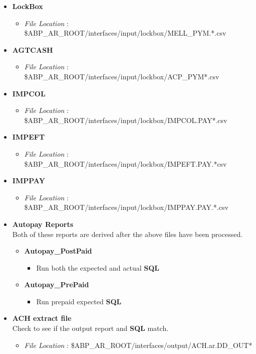 \documentclass[12pt,twoside]{article}
\begin{document}
\begin{itemize}
\item \textbf{LockBox}
\begin{itemize}
\item \emph{File Location} : \$ABP\_AR\_ROOT/interfaces/input/lockbox/MELL\_PYM.*.csv
\end{itemize}
\item \textbf{AGTCASH}
\begin{itemize}
\item \emph{File Location} : \$ABP\_AR\_ROOT/interfaces/input/lockbox/ACP\_PYM*.csv
\end{itemize}
\item \textbf{IMPCOL}
\begin{itemize}
\item \emph{File Location} : \$ABP\_AR\_ROOT/interfaces/input/lockbox/IMPCOL.PAY*.csv
\end{itemize}
\item \textbf{IMPEFT}
\begin{itemize}
\item \emph{File Location} : \$ABP\_AR\_ROOT/interfaces/input/lockbox/IMPEFT.PAY.*csv
\end{itemize}
\item \textbf{IMPPAY}
\begin{itemize}
\item \emph{File Location} : \$ABP\_AR\_ROOT/interfaces/input/lockbox/IMPPAY.PAY.*.csv
\end{itemize}
\item \textbf{Autopay Reports} \\ Both of these reports are derived after the above files have been processed.
\begin{itemize}
\item \textbf{Autopay\_PostPaid}
\begin{itemize}
\item Run both the expected and actual \textbf{SQL}
\end{itemize}
\item \textbf{Autopay\_PrePaid}
\begin{itemize}
\item Run prepaid expected \textbf{SQL}
\end{itemize}
\end{itemize}
\item \textbf{ACH extract file} \\Check to see if the output report and \textbf{SQL} match.
\begin{itemize}
\item \emph{File Location} : \$ABP\_AR\_ROOT/interfaces/output/ACH.ar.DD\_OUT*\\
\end{itemize}
\end{itemize}
\end{document}

